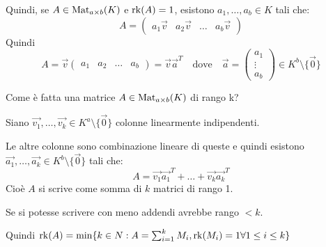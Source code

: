 \documentclass[../main.tex]{subfiles}
\begin{document}
Quindi, se $A \in \operatorname{Mat}_{a \times b}(K)$ e $\operatorname{rk}(A) = 1$, esistono $a_1, \ldots, a_b \in K$ tali che:
\begin{equation*}
    A = \begin{pmatrix}
        a_1 \overrightarrow{v} & a_2 \overrightarrow{v} & \ldots & a_b \overrightarrow{v}
    \end{pmatrix}
\end{equation*}
Quindi
\begin{equation*}
    A = \overrightarrow{v} \begin{pmatrix}
        a_1 & a_2 & \ldots & a_b
    \end{pmatrix} = \overrightarrow{v}\overrightarrow{a}^T
    \quad \text{dove} \quad \overrightarrow{a} = \begin{pmatrix}
        a_1    \\
        \vdots \\
        a_b
    \end{pmatrix} \in K^b \setminus \{\overrightarrow{0}\}
\end{equation*}

Come è fatta una matrice $A \in \operatorname{Mat}_{a \times b}(K)$ di rango k?

Siano $\overrightarrow{v_1}, \ldots, \overrightarrow{v_k} \in K^a \setminus \{\overrightarrow{0}\}$ colonne linearmente indipendenti.

Le altre colonne sono combinazione lineare di queste e quindi esistono $\overrightarrow{a_1}, \ldots, \overrightarrow{a_k} \in K^b \setminus \{\overrightarrow{0}\}$ tali che:
\begin{equation*}
    A = \overrightarrow{v_1}\overrightarrow{a_1}^T + \ldots + \overrightarrow{v_k}\overrightarrow{a_k}^T
\end{equation*}
Cioè $A$ si scrive come somma di $k$ matrici di rango 1.

Se si potesse scrivere con meno addendi avrebbe rango $< k$.

Quindi $\operatorname{rk}(A) = \min \{ k \in N : A = \sum_{i=1}^{k} M_i, \operatorname{rk}(M_i) = 1 \forall 1 \leq i \leq k\}$

\hrulefill
\end{document}
